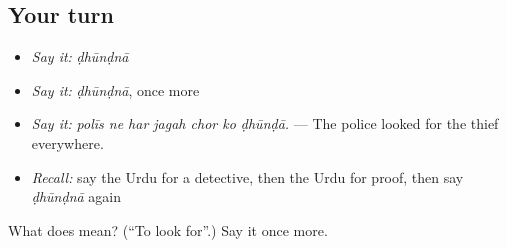 \subsection*{Your turn}
\begin{itemize}
\raggedright
  \item \emph{Say it:} \emph{ḍhūnḍnā}
  \item \emph{Say it:} \emph{ḍhūnḍnā}, once more
  \item \emph{Say it:} \emph{polīs ne har jagah chor ko ḍhūnḍā.} — The police looked for the thief everywhere.
  \item \emph{Recall:} say the Urdu for a detective, then the Urdu for proof, then say \emph{ḍhūnḍnā} again
\end{itemize}

\begin{tcolorbox}[breakable,colback=teal!4,colframe=teal!35!black,title={Before you move on}]
What does  mean? (\textquotedblleft{}To look for\textquotedblright{}.) Say it once more.
\end{tcolorbox}
